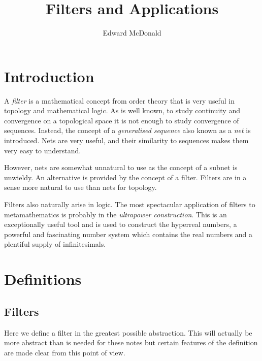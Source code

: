 \documentclass{owmaths}
\begin{document}
\subject{Misc.}
\author{Edward McDonald}
\title{Filters and Applications}

\newcommand{\Cliff}{\operatorname{Cliff}}
\newcommand{\Cl}{C\ell}
\newcommand{\im}{\operatorname{im}}
\newcommand{\com}{\mathrm{com}}
\newcommand{\Hom}{\operatorname{Hom}}
\newcommand{\A}{\mathcal{A}}
\newcommand{\Hilb}{\mathcal{H}}
\newcommand{\D}{\mathcal{D}}
\newcommand{\End}{\operatorname{End}}
\newcommand{\Mult}{\operatorname{Mult}}
\newcommand{\isom}{\cong}

\setlength\parindent{0pt}

\section{Introduction}    
A \emph{filter} is a mathematical concept from order theory that is
very useful in topology and mathematical logic. As is well known, to study
continuity and convergence on a topological space
it is not enough to study convergence of sequences. Instead, the concept
of a \emph{generalised sequence} also known as a \emph{net} is introduced. Nets are 
very useful, and their similarity to sequences makes them very easy to understand.

However, nets are somewhat unnatural to use as the concept of a subnet is unwieldy. 
An alternative is provided by the concept of a filter. Filters are in a sense more natural 
to use than nets for topology.

Filters also naturally arise in logic. The most spectacular
application of filters to metamathematics is probably in the \emph{ultrapower
construction}. This is an exceptionally useful tool and is used
to construct the hyperreal numbers, a powerful and fascinating number system
which contains the real numbers and a plentiful supply of infinitesimals.

\section{Definitions}
\subsection{Filters}
Here we define a filter in the greatest possible abstraction. This will
actually be more abstract than is needed for these notes but certain features
of the definition are made clear from this point of view.
\end{document}

